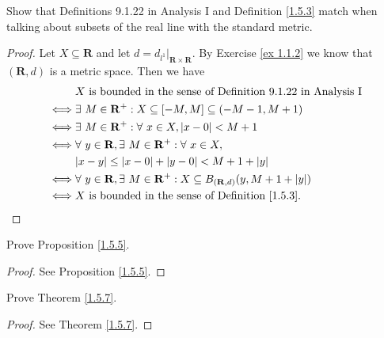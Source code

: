 \exercisesection

\begin{exercise}\label{ex 1.5.1}
    Show that Definitions 9.1.22 in Analysis I and Definition \ref{1.5.3} match when talking about subsets of the real line with the standard metric.
\end{exercise}

\begin{proof}
    Let \(X \subseteq \mathbf{R}\) and let \(d = d_{l^1}|_{\mathbf{R} \times \mathbf{R}}\).
    By Exercise \ref{ex 1.1.2} we know that \((\mathbf{R}, d)\) is a metric space.
    Then we have
    \begin{align*}
             & X \text{ is bounded in the sense of Definition 9.1.22 in Analysis I}                                          \\
        \iff & \exists\ M \in \mathbf{R}^+ : X \subseteq [-M, M] \subseteq (-M - 1, M + 1)                                   \\
        \iff & \exists\ M \in \mathbf{R}^+ : \forall\ x \in X, \abs*{x - 0} < M + 1                                          \\
        \iff & \forall\ y \in \mathbf{R}, \exists\ M \in \mathbf{R}^+ : \forall\ x \in X,                                    \\
             & \abs*{x - y} \leq \abs*{x - 0} + \abs*{y - 0} < M + 1 + \abs*{y}                                              \\
        \iff & \forall\ y \in \mathbf{R}, \exists\ M \in \mathbf{R}^+ : X \subseteq B_{(\mathbf{R}, d)}(y, M + 1 + \abs*{y}) \\
        \iff & X \text{ is bounded in the sense of Definition \ref{1.5.3}}.
    \end{align*}
\end{proof}

\begin{exercise}\label{ex 1.5.2}
    Prove Proposition \ref{1.5.5}.
\end{exercise}

\begin{proof}
    See Proposition \ref{1.5.5}.
\end{proof}

\begin{exercise}\label{ex 1.5.3}
    Prove Theorem \ref{1.5.7}.
\end{exercise}

\begin{proof}
    See Theorem \ref{1.5.7}.
\end{proof}

